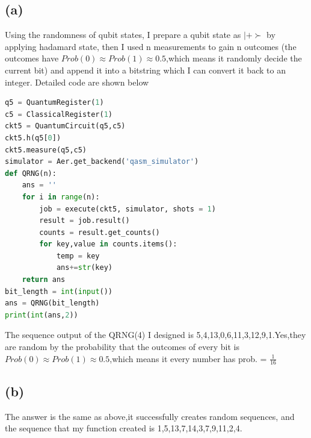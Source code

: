 \documentclass{article}
\begin{document}
\begin{CJK*}{UTF8}{bsmi}
\subsection{(a)}
Using the randomness of qubit states, I prepare a qubit state as $ \mid + \succ$ by applying hadamard state, then I used n measurements to gain n outcomes (the outcomes have $Prob(0) \approx Prob(1) \approx 0.5$,which means it randomly decide the current bit) and append it into a bitstring which I can convert it back to an integer. Detailed code are shown below
\begin{lstlisting}[language=Python]
q5 = QuantumRegister(1)
c5 = ClassicalRegister(1)
ckt5 = QuantumCircuit(q5,c5)
ckt5.h(q5[0])
ckt5.measure(q5,c5)
simulator = Aer.get_backend('qasm_simulator')
def QRNG(n):
    ans = ''
    for i in range(n):
        job = execute(ckt5, simulator, shots = 1)
        result = job.result()
        counts = result.get_counts()
        for key,value in counts.items():
            temp = key
            ans+=str(key)
    return ans
bit_length = int(input())
ans = QRNG(bit_length)
print(int(ans,2))
\end{lstlisting}
The sequence output of the QRNG(4) I designed is 5,4,13,0,6,11,3,12,9,1.Yes,they are random by the probability that the outcomes of every bit is $Prob(0) \approx Prob(1) \approx 0.5$,which means it every number has prob. = $\frac{1}{16}$
\subsection{(b)}
The answer is the same as above,it successfully creates random sequences, and the sequence that my function created is 1,5,13,7,14,3,7,9,11,2,4.
\end{CJK*}
\end{document}
